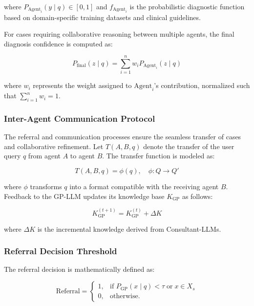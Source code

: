 \documentclass[letterpaper]{article} %
\begin{document}
where \( P_{\text{Agent}_i}(y \mid q) \in [0, 1] \) and \( f_{\text{Agent}_i} \) is the probabilistic diagnostic function based on domain-specific training datasets and clinical guidelines.

For cases requiring collaborative reasoning between multiple agents, the final diagnosis confidence is computed as:

\begin{equation}
P_{\text{final}}(z \mid q) = \sum_{i=1}^n w_i P_{\text{Agent}_i}(z \mid q)
\end{equation}

where \( w_i \) represents the weight assigned to \( \text{Agent}_i \)’s contribution, normalized such that \( \sum_{i=1}^n w_i = 1 \).

\subsubsection{Inter-Agent Communication Protocol}

The referral and communication processes ensure the seamless transfer of cases and collaborative refinement. Let \( T(A, B, q) \) denote the transfer of the user query \( q \) from agent \( A \) to agent \( B \). The transfer function is modeled as:

\begin{equation}
T(A, B, q) = \phi(q), \quad \phi: Q \to Q'
\end{equation}

where \( \phi \) transforms \( q \) into a format compatible with the receiving agent \( B \). Feedback to the GP-LLM updates its knowledge base \( K_{\text{GP}} \) as follows:

\begin{equation}
K_{\text{GP}}^{(t+1)} = K_{\text{GP}}^{(t)} + \Delta K
\end{equation}

where \( \Delta K \) is the incremental knowledge derived from Consultant-LLMs.

\subsubsection{Referral Decision Threshold}

The referral decision is mathematically defined as:

\begin{equation}
\text{Referral} = 
\begin{cases} 
1, & \text{if } P_{\text{GP}}(x \mid q) < \tau \; \text{or} \; x \in X_s \\
0, & \text{otherwise.}
\end{cases}
\end{equation}
\end{document}
